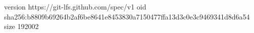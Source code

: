version https://git-lfs.github.com/spec/v1
oid sha256:b8809b69264b2af6be8641e8453830a7150477ffa13d3c0e3c9469341d8d6a54
size 192002
